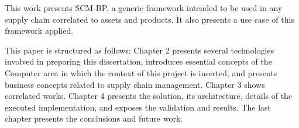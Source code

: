 This work presents \acf{SCM-BP}, a generic framework intended to be used in any supply chain correlated to assets and products. It also presents a use case of this framework applied.

This paper is structured as follows: Chapter 2 presents several technologies involved in preparing this dissertation, introduces essential concepts of the Computer area in which the context of this project is inserted, and presents business concepts related to supply chain management. Chapter 3 shows correlated works. Chapter 4 presents the solution, its architecture, details of the executed implementation, and exposes the validation and results. The last chapter presents the conclusions and future work.